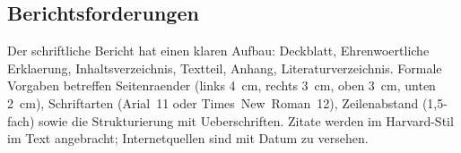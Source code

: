\subsection{Berichtsforderungen}

Der schriftliche Bericht hat einen klaren Aufbau: Deckblatt, Ehrenwoertliche Erklaerung, Inhaltsverzeichnis, Textteil, Anhang, Literaturverzeichnis. Formale Vorgaben betreffen Seitenraender (links 4~cm, rechts 3~cm, oben 3~cm, unten 2~cm), Schriftarten (Arial~11 oder Times~New~Roman~12), Zeilenabstand (1,5-fach) sowie die Strukturierung mit Ueberschriften. Zitate werden im Harvard-Stil im Text angebracht; Internetquellen sind mit Datum zu versehen.
